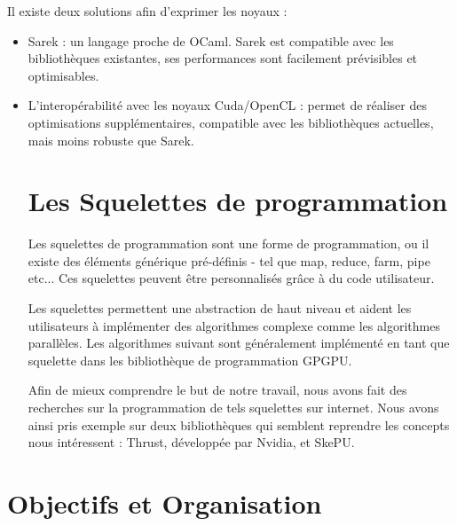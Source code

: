 \documentclass{report}
\begin{document}
Il existe deux solutions afin d’exprimer les noyaux :
\begin{itemize}
  
\item Sarek : un langage proche de OCaml. Sarek est compatible avec les bibliothèques existantes, ses performances sont facilement prévisibles et optimisables.
  
\item L’interopérabilité avec les noyaux Cuda/OpenCL : permet de réaliser des optimisations supplémentaires, compatible avec les bibliothèques actuelles, mais moins robuste que Sarek.

\section{Les Squelettes de programmation}
Les squelettes de programmation\cite{refSkeleton} sont une forme de programmation, ou il existe des éléments générique pré-définis - tel que map, reduce, farm, pipe etc... Ces squelettes peuvent être personnalisés grâce à du code utilisateur.\newline

Les squelettes permettent une abstraction de haut niveau et aident les utilisateurs à implémenter des algorithmes complexe comme les algorithmes parallèles. Les algorithmes suivant sont généralement implémenté en tant que squelette dans les bibliothèque de programmation GPGPU.\newline

Afin de mieux comprendre le but de notre travail, nous avons fait des recherches sur la programmation de tels squelettes sur internet. Nous avons ainsi pris exemple sur deux bibliothèques qui semblent reprendre les concepts nous intéressent : Thrust, développée par Nvidia, et SkePU.\newline

\end{itemize}

\section{Objectifs et Organisation}
\end{document}
